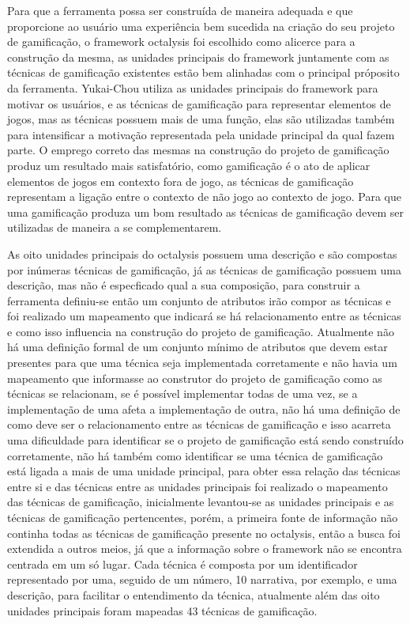 Para que a ferramenta possa ser construída de maneira adequada e que proporcione ao usuário uma experiência bem sucedida na criação do seu projeto de gamificação, o framework octalysis foi escolhido como alicerce para a construção da mesma, as unidades principais do framework juntamente com as técnicas de gamificação existentes estão bem alinhadas com o principal próposito da ferramenta. Yukai-Chou utiliza as unidades principais do framework para motivar os usuários, e as técnicas de gamificação para representar elementos de jogos, mas as técnicas possuem mais de uma função, elas são utilizadas também para intensificar a motivação representada pela unidade principal da qual fazem parte. O emprego correto das mesmas na construção do projeto de gamificação produz um resultado mais satisfatório, como gamificação é o ato de aplicar elementos de jogos em contexto fora de jogo, as técnicas de gamificação representam a ligação entre o contexto de não jogo ao contexto de jogo. Para que uma gamificação produza um bom resultado as técnicas de gamificação devem ser utilizadas de maneira a se complementarem.


As oito unidades principais do octalysis possuem uma descrição e são compostas por inúmeras técnicas de gamificação, já as técnicas de gamificação possuem uma descrição, mas não é especficado qual a sua composição, para construir a ferramenta definiu-se então um conjunto de atributos irão compor as técnicas e foi realizado um mapeamento que indicará se há relacionamento entre as técnicas e como isso influencia na construção do projeto de gamificação. Atualmente não há uma definição formal de um conjunto mínimo de atributos que devem estar presentes para que uma técnica seja implementada corretamente e não havia um mapeamento que informasse ao construtor do projeto de gamificação como as técnicas se relacionam, se é possível implementar todas de uma vez, se a implementação de uma afeta a implementação de outra, não há uma definição de como deve ser o relacionamento entre as técnicas de gamificação e isso acarreta uma dificuldade para identificar se o projeto de gamificação está sendo construído corretamente, não há também como identificar se uma técnica de gamificação está ligada a mais de uma unidade principal, para obter essa relação das técnicas entre si e das técnicas entre as unidades principais foi realizado o mapeamento das técnicas de gamificação, inicialmente levantou-se as unidades principais e as técnicas de gamificação pertencentes, porém, a primeira fonte de informação não continha todas as técnicas de gamificação presente no octalysis, então a busca foi extendida a outros meios, já que a informação sobre o framework não se encontra centrada em um só lugar. Cada técnica é composta por um identificador representado por uma, seguido de um número, 10 narrativa, por exemplo, e uma descrição, para facilitar o entendimento da técnica, atualmente além das oito unidades principais foram mapeadas 43 técnicas de gamificação.

